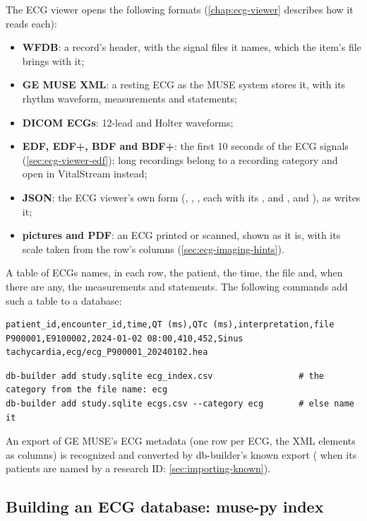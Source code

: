 The ECG viewer opens the following formats (\cref{chap:ecg-viewer} describes how it reads each):
\begin{itemize}
\item \textbf{WFDB}: a record's header, with the signal files it names, which the item's file
  brings with it;
\item \textbf{GE MUSE XML}: a resting ECG as the MUSE system stores it, with its rhythm waveform,
  measurements and statements;
\item \textbf{DICOM ECGs}: 12-lead and Holter waveforms;
\item \textbf{EDF, EDF+, BDF and BDF+}: the first 10 seconds of the ECG signals
  (\cref{sec:ecg-viewer-edf}); long recordings belong to a recording category and open in
  VitalStream instead;
\item \textbf{JSON}: the ECG viewer's own form (, , , each with
  its ,  and , and ), as  writes
  it;
\item \textbf{pictures and PDF}: an ECG printed or scanned, shown as it is, with its scale taken
  from the row's columns (\cref{sec:ecg-imaging-hints}).
\end{itemize}

A table of ECGs names, in each row, the patient, the time, the file and, when there are any, the
measurements and statements. The following commands add such a table to a database:
\begin{lstlisting}[language=CSV]
patient_id,encounter_id,time,QT (ms),QTc (ms),interpretation,file
P900001,E9100002,2024-01-02 08:00,410,452,Sinus tachycardia,ecg/ecg_P900001_20240102.hea
\end{lstlisting}
\begin{lstlisting}[style=shell]
db-builder add study.sqlite ecg_index.csv                 # the category from the file name: ecg
db-builder add study.sqlite ecgs.csv --category ecg       # else name it
\end{lstlisting}
An export of GE MUSE's ECG metadata (one row per ECG, the XML elements as columns) is recognized
and converted by db-builder's known export  ( when its
patients are named by a research ID: \cref{sec:importing-known}).

\subsection{Building an ECG database: muse-py index}
\label{sec:ecg-imaging-muse}

